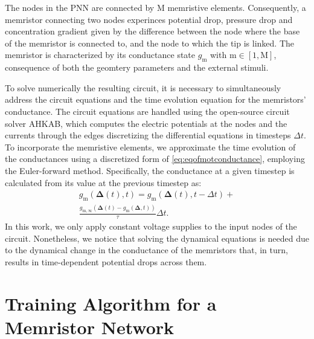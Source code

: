 \documentclass[reprint,superscriptaddress,prb,showkeys]{revtex4-2}
\newcommand{\m}{\text{m}} %
\newcommand{\M}{\text{M}} %
\newcommand{\brac}[1]{\left(#1 \right)} %
\begin{document}
The nodes in the PNN are connected by $\M$ memristive elements. Consequently, a memristor connecting two nodes experinces potential drop, pressure drop and concentration gradient given by the difference between the node where the base of the memristor is connected to, and the node to which the tip is linked. The memristor is characterized by its conductance state $g_{\m}$ with $\m\in[1,\M]$, consequence of both the geomtery parameters and the external stimuli.

To solve numerically the resulting circuit, it is necessary to simultaneously address the circuit equations and the time evolution equation for the memristors' conductance. 
The circuit equations are handled using the open-source circuit solver \textsc{AHKAB}\cite{}, which computes the electric potentials at the nodes and the currents through the edges discretizing the differential equations in timesteps $\Delta t$. To incorporate the memristive elements, we approximate the time evolution of the conductances using a discretized form of \cref{eq:eqofmotconductance}, employing the Euler-forward method. Specifically, the conductance at a given timestep is calculated from its value at the previous timestep as:
\begin{multline}
g_{\m}\brac{\boldsymbol{\Delta}(t), t} = g_{\m}\brac{\boldsymbol{\Delta}(t), t-\Delta t} + \\
 \frac{g_{\m,\infty}\brac{\boldsymbol{\Delta}(t)-g_{\m}\brac{\boldsymbol{\Delta}, t}}}{\tau}\Delta t.
\end{multline}
In this work, we only apply constant voltage supplies to the input nodes of the circuit. Nonetheless, we notice that solving the dynamical equations is needed due to the dynamical change in the conductance of the memristors that, in turn, results in time-dependent potential drops across them.

\section{\label{sec:training}Training Algorithm for a Memristor Network}
\end{document}
